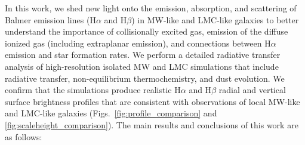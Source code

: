 \documentclass[fleqn,usenatbib]{mnras}
\begin{document}
In this work, we shed new light onto the emission, absorption, and scattering of Balmer emission lines (H$\alpha$ and H$\beta$) in MW-like and LMC-like galaxies to better understand the importance of collisionally excited gas, emission of the diffuse ionized gas (including extraplanar emission), and connections between H$\alpha$ emission and star formation rates. We perform a detailed radiative transfer analysis of high-resolution isolated MW and LMC simulations that include radiative transfer, non-equilibrium thermochemistry, and dust evolution. We confirm that the simulations produce realistic H$\alpha$ and H$\beta$ radial and vertical surface brightness profiles that are consistent with observations of local MW-like and LMC-like galaxies (Figs.~\ref{fig:profile_comparison} and \ref{fig:scaleheight_comparison}). The main results and conclusions of this work are as follows:
\end{document}
